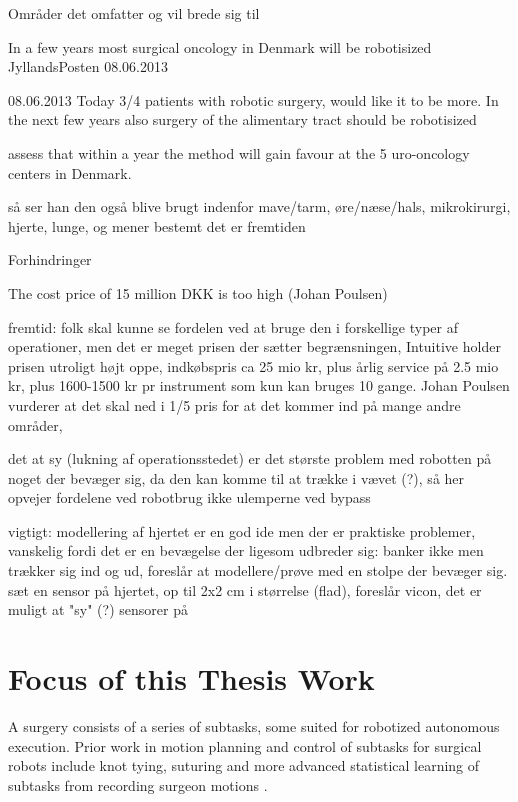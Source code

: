 Områder det omfatter og vil brede sig til

In a few years most surgical oncology in Denmark will be robotisized JyllandsPosten 08.06.2013 

08.06.2013 Today 3/4 patients with robotic surgery, would like it to be more. In the next few years also surgery of the alimentary tract should be robotisized

\citep{bib:dagensmedicin} assess that within a year the method will gain favour at the 5 uro-oncology centers in Denmark.

så ser han den også blive brugt indenfor mave/tarm, øre/næse/hals, mikrokirurgi, hjerte, lunge, og mener bestemt det er fremtiden



Forhindringer

The cost price of 15 million DKK is too high (Johan Poulsen)

fremtid: folk skal kunne se fordelen ved at bruge den i forskellige typer af operationer, men det er meget prisen der sætter begrænsningen, Intuitive holder prisen utroligt højt oppe, indkøbspris ca 25 mio kr, plus årlig service på 2.5 mio kr, plus 1600-1500 kr pr instrument som kun kan bruges 10 gange. Johan Poulsen vurderer at det skal ned i 1/5 pris for at det kommer ind på mange andre områder, 

det at sy (lukning af operationsstedet) er det største problem med robotten på noget der bevæger sig, da den kan komme til at trække i vævet (?), så her opvejer fordelene ved robotbrug ikke ulemperne ved bypass

vigtigt: modellering af hjertet er en god ide men der er praktiske problemer, vanskelig fordi det er en bevægelse der ligesom udbreder sig: banker ikke men trækker sig ind og ud, foreslår at modellere/prøve med en stolpe der bevæger sig. sæt en sensor på hjertet, op til 2x2 cm i størrelse (flad), foreslår vicon, det er muligt at "sy" (?) sensorer på
















\section{Focus of this Thesis Work}
A surgery consists of a series of subtasks, some suited for robotized autonomous execution. Prior work in motion planning and control of subtasks for surgical robots include knot tying, suturing and more advanced statistical learning of subtasks from recording surgeon motions \citep{bib:raven_debride,bib:raven_observ}.

